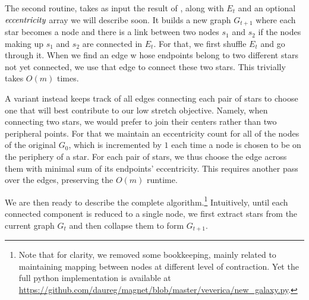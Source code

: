 \bigskip

The second routine, \collapseStar{} takes as input the result of \extractStar{}, along with $E_t$
and an optional $\emph{eccentricity}$ array we will describe soon. It builds a new graph $G_{t+1}$
where each star becomes a node and there is a link between two nodes $s_1$ and $s_2$ if the nodes
making up $s_1$ and $s_2$ are connected in $E_t$. For that, we first shuffle $E_t$ and go through
it. When we  find an edge w hose endpoints belong to two different stars not yet connected, we use
that edge to connect these two stars. This trivially takes $O(m)$ times.

A variant instead keeps track of all edges connecting each pair of stars to choose one that will
best contribute to our low stretch objective. Namely, when connecting two stars, we would prefer to
join their centers rather than two peripheral points. For that we maintain an eccentricity count for
all of the nodes of the original $G_0$, which is incremented by $1$ each time a node is chosen to be
on the periphery of a star.
For each pair of stars, we thus choose the edge across them with minimal sum of its endpoints'
eccentricity. This requires another pass over the edges, preserving the $O(m)$ runtime.

\bigskip

We are then ready to describe the complete \gtx{} algorithm.\footnote{Note that for clarity, we
removed some bookkeeping, mainly related to maintaining mapping between nodes at different level of
contraction. Yet the full python implementation is available at
\url{https://github.com/daureg/magnet/blob/master/veverica/new_galaxy.py}.} Intuitively, until each
connected component is reduced to a single node, we first extract stars from the current graph $G_t$
and then collapse them to form $G_{t+1}$.

